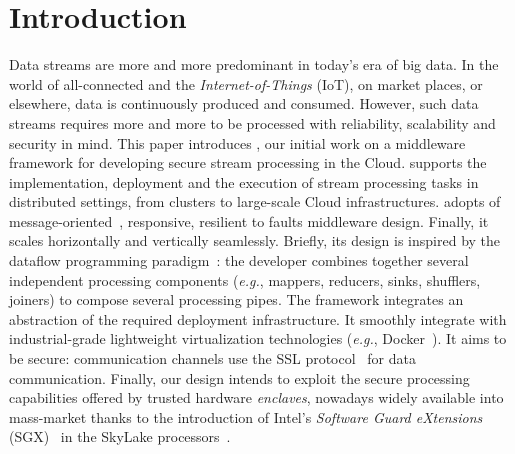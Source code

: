 \section{Introduction}
\label{sec:introduction}


Data streams are more and more predominant in today's era of big data.
In the world of all-connected and the \emph{Internet-of-Things} (IoT), on market places, or elsewhere, data is continuously produced and consumed.
However, such data streams requires more and more to be processed with reliability, scalability and security in mind.
This paper introduces \SYS{}, our initial work on a middleware framework for developing secure stream processing in the Cloud.
\SYS{} supports the implementation, deployment and the execution of stream processing tasks in distributed settings, from clusters to large-scale Cloud infrastructures.
\SYS{} adopts of message-oriented~\cite{mom}, responsive, resilient to faults middleware design.
Finally, it scales horizontally and vertically seamlessly.
Briefly, its design is inspired by the dataflow programming paradigm~\cite{uustalu_essence_2005}: the developer combines together several independent processing components (\emph{e.g.}, mappers, reducers, sinks, shufflers, joiners) to compose several processing pipes.%
The framework integrates an abstraction of the required deployment infrastructure.
It smoothly integrate with industrial-grade lightweight virtualization technologies (\emph{e.g.}, Docker~\cite{docker}).
It aims to be secure: communication channels use the SSL protocol~\cite{freier2011secure} for data communication.
Finally, our design intends to exploit the secure processing capabilities offered by trusted hardware \emph{enclaves}, nowadays widely available into mass-market thanks to the introduction of Intel's \emph{Software Guard eXtensions} (SGX)~\cite{costan_intel} in the SkyLake processors~\cite{skylake}.

